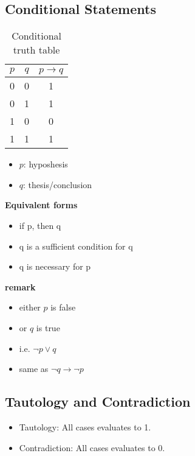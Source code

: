 \documentclass{article}
\theoremstyle{definition}
\begin{document}
\subsection{Conditional Statements}
\begin{table}[h]
    \centering
    \caption{Conditional truth table}

    \begin{tabular}{|c|c|c|}
        \hline  $p$   &   $q$   &   $p \rightarrow q$   \\
        \hline  0   &   0   &   1   \\
        \hline  0   &   1   &   1   \\
        \hline  1   &   0   &   0   \\
        \hline  1   &   1   &   1   \\
        \hline
    \end{tabular}
\end{table}
\begin{itemize}
    \item $p$: hyposhesis
    \item $q$: thesis/conclusion
\end{itemize}
\textbf{Equivalent forms}
\begin{itemize}
    \item if p, then q
    \item q is a sufficient condition for q
    \item q is necessary for p
\end{itemize}
\textbf{remark}
\begin{itemize}
    \item either $p$ is false
    \item or $q$ is true
    \item i.e. $\neg p \lor q$
    \item same as $\neg q \rightarrow \neg p$
\end{itemize}
\subsection{Tautology and Contradiction}
\begin{itemize}
    \item Tautology: All cases evaluates to 1.
    \item Contradiction: All cases evaluates to 0.
\end{itemize}
\end{document}
